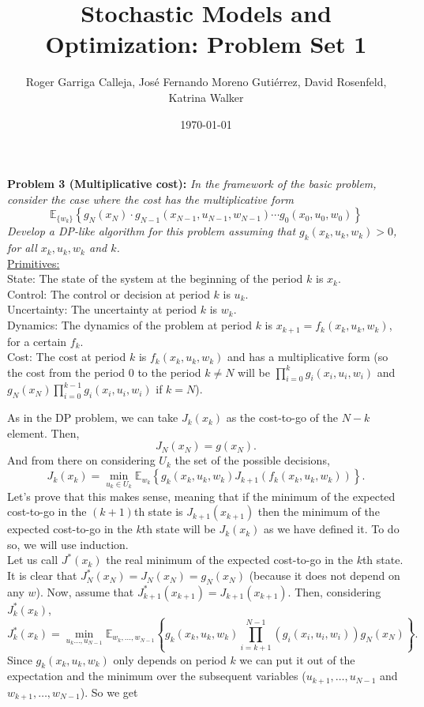 \documentclass[11pt, english]{article}
\title{Stochastic Models and Optimization: Problem Set 1}
\author{Roger Garriga Calleja, José Fernando Moreno Gutiérrez, David Rosenfeld, Katrina Walker}
\date{\today}
\begin{document}
\maketitle

\textbf{Problem 3 (Multiplicative cost):}\textit{ In the framework of the basic problem, consider the case where the cost has the multiplicative form}
$$\mathbb{E}_{\{w_k\}}\left\{g_N(x_N)\cdot g_{N-1}(x_{N-1},u_{N-1},w_{N-1})\cdots g_0(x_0,u_0,w_0) \right\}$$
\textit{Develop a DP-like algorithm for this problem assuming that $g_k(x_k,u_k,w_k)>0$, for all $x_k,u_k,w_k$ and $k$.}\\
\underline{Primitives:}\\
State: The state of the system at the beginning of the period $k$ is $x_k$.\\
Control: The control or decision at period $k$ is $u_k$.\\
Uncertainty: The uncertainty at period $k$ is $w_k$.\\
Dynamics: The dynamics of the problem at period $k$ is $x_{k+1}=f_k(x_k,u_k,w_k)$, for a certain $f_k$.\\
Cost: The cost at period $k$ is $f_k(x_k,u_k,w_k)$ and has a multiplicative form (so the cost from the period 0 to the period $k\neq N$ will be $\prod\limits_{i=0}^k g_i(x_i,u_i,w_i)$ and $g_N(x_N)\prod\limits_{i=0}^{k-1} g_i(x_i,u_i,w_i)$ if $k=N$).
 
As in the DP problem, we can take $J_k(x_k)$ as the cost-to-go of the $N-k$ element. Then, 
$$J_N(x_N)=g(x_N).$$
And from there on considering $U_k$ the set of the possible decisions,
$$J_{k}(x_k)=\underset{u_k\in U_k}{\min}\mathbb{E}_{w_k}\left\{g_k(x_k,u_k,w_k)J_{k+1}(f_k(x_k,u_k,w_k))\right\}.$$
Let's prove that this makes sense, meaning that if the minimum of the expected cost-to-go in the $(k+1)$th state is $J_{k+1}(x_{k+1})$ then the minimum of the expected cost-to-go in the $k$th state will be $J_k(x_k)$ as we have defined it. To do so, we will use induction. \\

Let us call $J^*(x_k)$ the real minimum of the expected cost-to-go in the $k$th state. It is clear that $J_N^*(x_N)=J_N(x_N)=g_N(x_N)$ (because it does not depend on any $w$). Now, assume that $J_{k+1}^*(x_{k+1})=J_{k+1}(x_{k+1})$. Then, considering $J_k^*(x_k)$,
$$J_k^*(x_k)=\underset{u_{k}\dots, u_{N-1}}{\min}\mathbb{E}_{w_{k},\dots,w_{N-1}}\left\{g_k(x_k,u_k,w_k)\prod\limits_{i=k+1}^{N-1}
\left(g_i(x_i,u_i,w_i)\right)g_N(x_N)\right\}.$$
Since $g_k(x_k,u_k,w_k)$ only depends on period $k$ we can put it out of the expectation and the minimum over the subsequent variables ($u_{k+1},\dots,u_{N-1}$ and $w_{k+1},\dots,w_{N-1}$). So we get
\end{document}
